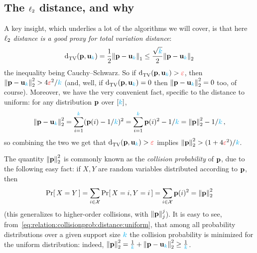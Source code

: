 \subsection{The $\lp[2]$ distance, and why}
A key insight, which underlies a lot of the algorithms we will cover, is that here \emph{$\lp[2]$ distance is a good proxy for total variation distance}:
\begin{equation}
  \label{eq:relation:l1:l2:cs}
  \totalvardist{\p}{\uniform_\ab} = \frac{1}{2}\normone{\p-\uniform_\ab} \leq \frac{\sqrt{\ab}}{2}\normtwo{\p-\uniform_\ab}
\end{equation}
the inequality being Cauchy--Schwarz. So if $\totalvardist{\p}{\uniform_\ab}>\dst$, then $\normtwo{\p-\uniform_\ab}^2 > 4\dst^2/\ab$ (and, well, if $\totalvardist{\p}{\uniform_\ab}=0$ then $\normtwo{\p-\uniform_\ab}^2=0$ too, of course). Moreover, we have the very convenient fact, specific to the distance to uniform: for any distribution $\p$ over $[\ab]$,
\begin{equation}
  \label{eq:relation:collisionprob:distance:uniform}
  \normtwo{\p-\uniform_\ab}^2 = \sum_{i=1}^\ab (\p(i)-1/\ab)^2  = \sum_{i=1}^\ab \p(i)^2-1/\ab = \normtwo{\p}^2-1/\ab\,,
\end{equation}
so combining the two we get that $\totalvardist{\p}{\uniform_\ab}>\dst$ implies $\normtwo{\p}^2 > (1+4\dst^2)/\ab$.

\begin{remark}
  \label{rk:collision:probability}
  The quantity $\normtwo{\p}^2$ is commonly known as the \emph{collision probability} of $\p$, due to the following easy fact: if $X,Y$ are \iid random variables distributed according to $\p$, then
  \begin{equation}
      \probaOf{X=Y} = \sum_{i\in\domain} \probaOf{X=i, Y=i} = \sum_{i\in\domain} \p(i)^2 = \normtwo{\p}^2
  \end{equation}
  (this generalizes to higher-order collisions, with $\norm{\p}_j^j$). It is easy to see, from~\cref{eq:relation:collisionprob:distance:uniform}, that among all probability distributions over a given support size $\ab$ the collision probability is minimized for the uniform distribution: indeed, $\normtwo{\p}^2 = \frac{1}{\ab}+ \normtwo{\p-\uniform_\ab}^2 \geq \frac{1}{\ab}$. 
\end{remark}

